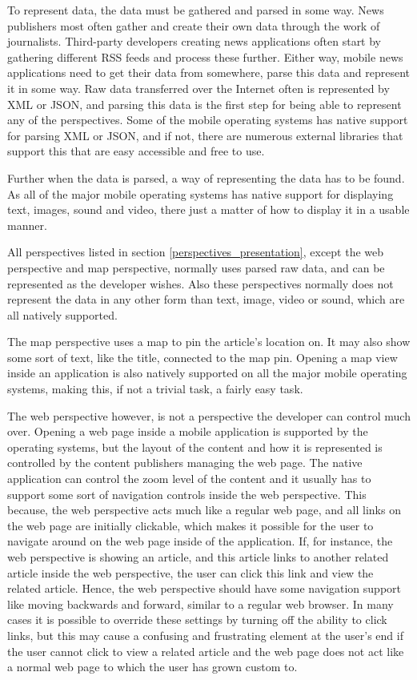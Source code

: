To represent data, the data must be gathered and parsed in some way. News publishers most often gather and create their own data through the work of journalists. Third-party developers creating news applications often start by gathering different RSS feeds and process these further. Either way, mobile news applications need to get their data from somewhere, parse this data and represent it in some way. Raw data transferred over the Internet often is represented by XML or JSON, and parsing this data is the first step for being able to represent any of the perspectives. Some of the mobile operating systems has native support for parsing XML or JSON, and if not, there are numerous external libraries that support this that are easy accessible and free to use.

Further when the data is parsed, a way of representing the data has to be found. As all of the major mobile operating systems has native support for displaying text, images, sound and video, there just a matter of how to display it in a usable manner.

All perspectives listed in section \ref{perspectives_presentation}, except the web perspective and map perspective, normally uses parsed raw data, and can be represented as the developer wishes. Also these perspectives normally does not represent the data in any other form than text, image, video or sound, which are all natively supported.

The map perspective uses a map to pin the article's location on. It may also show some sort of text, like the title, connected to the map pin. Opening a map view inside an application is also natively supported on all the major mobile operating systems, making this, if not a trivial task, a fairly easy task.

The web perspective however, is not a perspective the developer can control much over. Opening a web page inside a mobile application is supported by the operating systems, but the layout of the content and how it is represented is controlled by the content publishers managing the web page. The native application can control the zoom level of the content and it usually has to support some sort of navigation controls inside the web perspective. This because, the web perspective acts much like a regular web page, and all links on the web page are initially clickable, which makes it possible for the user to navigate around on the web page inside of the application. If, for instance, the web perspective is showing an article, and this article links to another related article inside the web perspective, the user can click this link and view the related article. Hence, the web perspective should have some navigation support like moving backwards and forward, similar to a regular web browser. In many cases it is possible to override these settings by turning off the ability to click links, but this may cause a confusing and frustrating element at the user's end if the user cannot click to view a related article and the web page does not act like a normal web page to which the user has grown custom to.